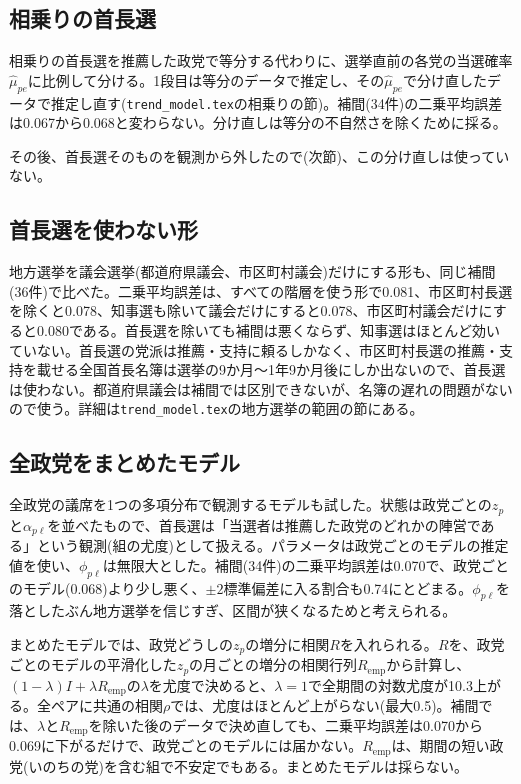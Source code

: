 \documentclass[a4paper,11pt]{ltjsarticle}
\begin{document}
\subsection{相乗りの首長選}

相乗りの首長選を推薦した政党で等分する代わりに、選挙直前の各党の当選確率$\hat\mu_{pe}$に比例して分ける。1段目は等分のデータで推定し、その$\hat\mu_{pe}$で分け直したデータで推定し直す(\texttt{trend\_model.tex}の相乗りの節)。補間(34件)の二乗平均誤差は0.067から0.068と変わらない。分け直しは等分の不自然さを除くために採る。

その後、首長選そのものを観測から外したので(次節)、この分け直しは使っていない。

\subsection{首長選を使わない形}

地方選挙を議会選挙(都道府県議会、市区町村議会)だけにする形も、同じ補間(36件)で比べた。二乗平均誤差は、すべての階層を使う形で0.081、市区町村長選を除くと0.078、知事選も除いて議会だけにすると0.078、市区町村議会だけにすると0.080である。首長選を除いても補間は悪くならず、知事選はほとんど効いていない。首長選の党派は推薦・支持に頼るしかなく、市区町村長選の推薦・支持を載せる全国首長名簿は選挙の9か月〜1年9か月後にしか出ないので、首長選は使わない。都道府県議会は補間では区別できないが、名簿の遅れの問題がないので使う。詳細は\texttt{trend\_model.tex}の地方選挙の範囲の節にある。

\subsection{全政党をまとめたモデル}

全政党の議席を1つの多項分布で観測するモデルも試した。状態は政党ごとの$z_p$と$\alpha_{p\ell}$を並べたもので、首長選は「当選者は推薦した政党のどれかの陣営である」という観測(組の尤度)として扱える。パラメータは政党ごとのモデルの推定値を使い、$\phi_{p\ell}$は無限大とした。補間(34件)の二乗平均誤差は0.070で、政党ごとのモデル(0.068)より少し悪く、$\pm2$標準偏差に入る割合も0.74にとどまる。$\phi_{p\ell}$を落としたぶん地方選挙を信じすぎ、区間が狭くなるためと考えられる。

まとめたモデルでは、政党どうしの$z_p$の増分に相関$R$を入れられる。$R$を、政党ごとのモデルの平滑化した$z_p$の月ごとの増分の相関行列$R_{\text{emp}}$から計算し、$(1-\lambda)I+\lambda R_{\text{emp}}$の$\lambda$を尤度で決めると、$\lambda=1$で全期間の対数尤度が10.3上がる。全ペアに共通の相関$\rho$では、尤度はほとんど上がらない(最大0.5)。補間では、$\lambda$と$R_{\text{emp}}$を除いた後のデータで決め直しても、二乗平均誤差は0.070から0.069に下がるだけで、政党ごとのモデルには届かない。$R_{\text{emp}}$は、期間の短い政党(いのちの党)を含む組で不安定でもある。まとめたモデルは採らない。
\end{document}
